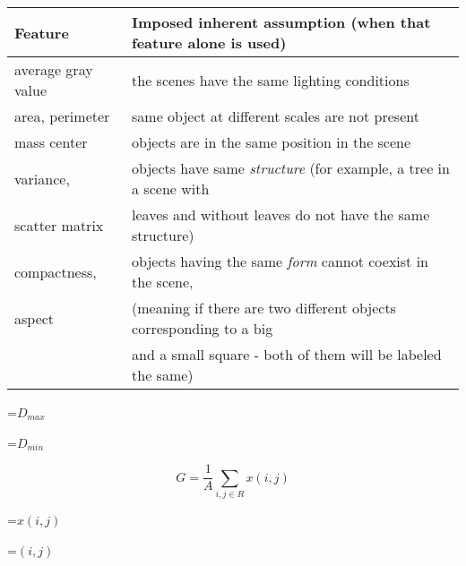 {\newpage
\clearpage
\samepage \begin{table}\begin{center}
 
\begin{tabular}{||l||l||} \hline \hline
Feature & Imposed inherent assumption (when that feature alone is used)\\  
\hline \hline
average gray value & the scenes have the same lighting conditions\\  \hline
area, perimeter & same object at different scales are not present \\  
\hline mass center & objects are in the same position in the scene \\  \hline
variance, & objects have same {\em structure} (for example, a tree in 
a scene with \\ 
scatter matrix &leaves and without leaves do not have the same structure)
\\  \hline
compactness, & objects having the same {\em form} cannot coexist in the
scene,\\   
aspect & (meaning if there are two different objects corresponding to a big 
\\  & and a small square - both of them will be labeled the same) \\  \hline 
\hline \end{tabular} \end{center}
 

\label{tab:ii_fea_ass_prob}
\end{table}
}

{\newpage
\clearpage
\samepage \setbox\sizebox=\hbox{$D_{max} $}\box\sizebox
}

{\newpage
\clearpage
\samepage \setbox\sizebox=\hbox{$D_{min} $}\box\sizebox
}

{\newpage
\clearpage
\samepage \begin{displaymath}G = \frac{1}{A} \sum_{i,j \in R} 
x(i,j) \end{displaymath}
}

{\newpage
\clearpage
\samepage \setbox\sizebox=\hbox{$x(i,j)$}\box\sizebox
}

{\newpage
\clearpage
\samepage \setbox\sizebox=\hbox{$(i,j)$}\box\sizebox
}

